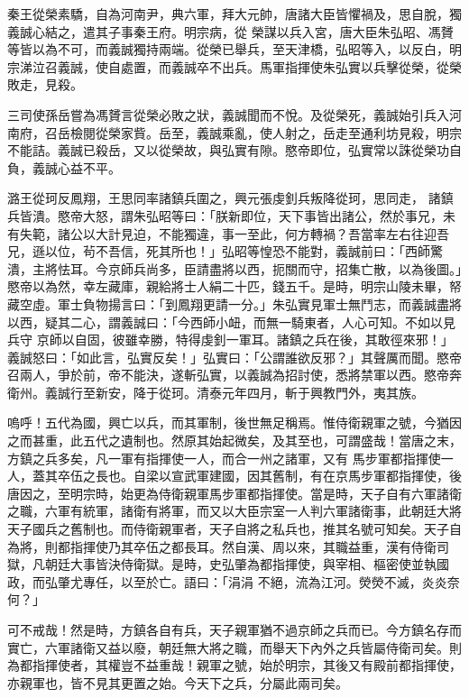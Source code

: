 \begin{pinyinscope}
 秦王從榮素驕，自為河南尹，典六軍，拜大元帥，唐諸大臣皆懼禍及，思自脫，獨義誠心結之，遣其子事秦王府。明宗病，從
 榮謀以兵入宮，唐大臣朱弘昭、馮贇等皆以為不可，而義誠獨持兩端。從榮已舉兵，至天津橋，弘昭等入，以反白，明宗涕泣召義誠，使自處置，而義誠卒不出兵。馬軍指揮使朱弘實以兵擊從榮，從榮敗走，見殺。



 三司使孫岳嘗為馮贇言從榮必敗之狀，義誠聞而不悅。及從榮死，義誠始引兵入河南府，召岳檢閱從榮家貲。岳至，義誠乘亂，使人射之，岳走至通利坊見殺，明宗不能詰。義誠已殺岳，又以從榮故，與弘實有隙。愍帝即位，弘實常以誅從榮功自負，義誠心益不平。



 潞王從珂反鳳翔，王思同率諸鎮兵圍之，興元張虔釗兵叛降從珂，思同走，
 諸鎮兵皆潰。愍帝大怒，謂朱弘昭等曰：「朕新即位，天下事皆出諸公，然於事兄，未有失範，諸公以大計見迫，不能獨違，事一至此，何方轉禍？吾當率左右往迎吾兄，遜以位，茍不吾信，死其所也！」弘昭等惶恐不能對，義誠前曰：「西師驚潰，主將怯耳。今京師兵尚多，臣請盡將以西，扼關而守，招集亡散，以為後圖。」愍帝以為然，幸左藏庫，親給將士人絹二十匹，錢五千。是時，明宗山陵未畢，帑藏空虛。軍士負物揚言曰：「到鳳翔更請一分。」朱弘實見軍士無鬥志，而義誠盡將以西，疑其二心，謂義誠曰：「今西師小衄，而無一騎東者，人心可知。不如以見兵守
 京師以自固，彼雖幸勝，特得虔釗一軍耳。諸鎮之兵在後，其敢徑來邪！」義誠怒曰：「如此言，弘實反矣！」弘實曰：「公謂誰欲反邪？」其聲厲而聞。愍帝召兩人，爭於前，帝不能決，遂斬弘實，以義誠為招討使，悉將禁軍以西。愍帝奔衛州。義誠行至新安，降于從珂。清泰元年四月，斬于興教門外，夷其族。



 嗚呼！五代為國，興亡以兵，而其軍制，後世無足稱焉。惟侍衛親軍之號，今猶因之而甚重，此五代之遺制也。然原其始起微矣，及其至也，可謂盛哉！當唐之末，方鎮之兵多矣，凡一軍有指揮使一人，而合一州之諸軍，又有
 馬步軍都指揮使一人，蓋其卒伍之長也。自梁以宣武軍建國，因其舊制，有在京馬步軍都指揮使，後唐因之，至明宗時，始更為侍衛親軍馬步軍都指揮使。當是時，天子自有六軍諸衛之職，六軍有統軍，諸衛有將軍，而又以大臣宗室一人判六軍諸衛事，此朝廷大將天子國兵之舊制也。而侍衛親軍者，天子自將之私兵也，推其名號可知矣。天子自為將，則都指揮使乃其卒伍之都長耳。然自漢、周以來，其職益重，漢有侍衛司獄，凡朝廷大事皆決侍衛獄。是時，史弘肇為都指揮使，與宰相、樞密使並執國政，而弘肇尤專任，以至於亡。語曰：「涓涓
 不絕，流為江河。熒熒不滅，炎炎奈何？」



 可不戒哉！然是時，方鎮各自有兵，天子親軍猶不過京師之兵而已。今方鎮名存而實亡，六軍諸衛又益以廢，朝廷無大將之職，而舉天下內外之兵皆屬侍衛司矣。則為都指揮使者，其權豈不益重哉！親軍之號，始於明宗，其後又有殿前都指揮使，亦親軍也，皆不見其更置之始。今天下之兵，分屬此兩司矣。




\end{pinyinscope}
